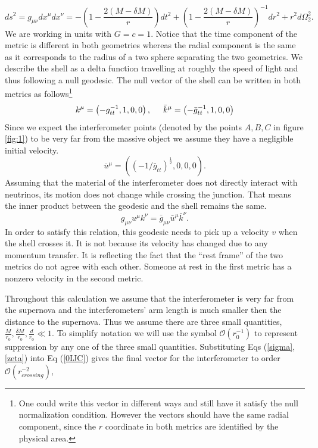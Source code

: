 \documentclass[aps,showpacs,onecolumn,floats,prd,superscriptaddress,nofootinbib]{revtex4-1}
\begin{document}
\begin{equation}
	ds^2 = g_{\mu \nu} dx^\mu dx^\nu = - \left( 1 - \frac{2(M - \delta M)}{r} \right) dt^2 + \left( 1 - \frac{2(M - \delta M)}{r} \right)^{-1} dr^2 + r^2 d \Omega_2^2. \label{SCHa}
\end{equation}
We are working in units with $G = c =1$.  Notice that the time component of the metric is different in both geometries whereas the radial component is the same as it corresponds to the radius of a two sphere separating the two geometries.  We describe the shell as a delta function travelling at roughly the speed of light and thus following a null geodesic. The null vector of the shell can be written in both metrics as follows\footnote{One could write this vector in different ways and still have it satisfy the null normalization condition. However the vectors should have the same radial component, since the $r$ coordinate in both metrics are identified by the physical area.}
\begin{equation}
	k^\mu = \left( -g_{tt}^{-1}, 1, 0, 0 \right), \hspace{5mm} \bar{k}^\mu = \left( -\bar{g}_{tt}^{-1}, 1, 0, 0 \right)	\label{sigma}
\end{equation}
Since we expect the interferometer points (denoted by the points $A,B,C$ in figure \ref{fig:1}) to be very far from the massive object we assume they have a negligible initial velocity.
\begin{equation}
	\bar{u}^\mu = \left( (-1/\bar{g}_{tt})^\frac{1}{2}, 0, 0, 0 \right).	\label{zeta}
\end{equation}
Assuming that the material of the interferometer does not directly interact with neutrinos, its motion does not change while crossing the junction. 
That means the inner product between the geodesic and the shell remains the same.\begin{equation}
	 g_{\mu \nu} u^\mu k^\nu = \bar{g}_{\mu \nu} \bar{u}^\mu \bar{k}^\nu. 	\label{0IJC}
\end{equation}
In order to satisfy this relation, this geodesic needs to pick up a velocity $v$ when the shell crosses it.
It is not because its velocity has changed due to any momentum transfer.
It is reflecting the fact that the ``rest frame'' of the two metrics do not agree with each other.
Someone at rest in the first metric has a nonzero velocity in the second metric.

Throughout this calculation we assume that the interferometer is very far from the supernova and the interferometers' arm length is much smaller then the distance to the supernova. Thus we assume there are three small quantities, $\frac{M}{r_0}, \frac{\delta M}{r_0}, \frac{d}{r_0}\ll1$. To simplify notation we will use the symbol $\mathcal{O}(r^{-1}_{0})$ to represent suppression by any one of the three small quantities. 
Substituting Eqs (\ref{sigma}, \ref{zeta}) into Eq (\ref{0IJC}) gives the final vector for the interferometer to order $\mathcal{O}(r_{crossing}^{-2})$,
\end{document}
